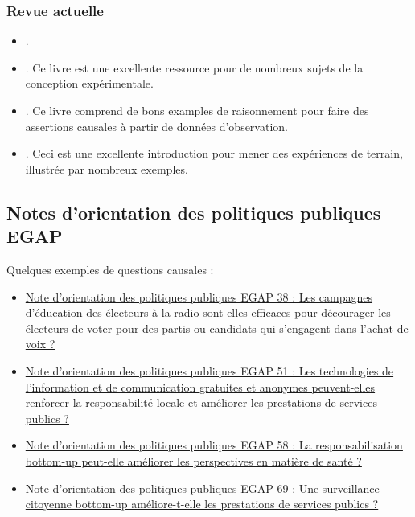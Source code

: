 \documentclass[12pt,]{book}
\begin{document}
\hypertarget{revue-actuelle}{%
\subsubsection{Revue actuelle}\label{revue-actuelle}}

\begin{itemize}
\item
  \autocite{brady2008causation}.
\item
  \autocite[Chapitre 1]{gerber_field_2012}. Ce livre est une excellente ressource pour de nombreux sujets de la conception expérimentale.
\item
  \autocite[Chapitre 1]{morgan_counterfactuals_2007}. Ce livre comprend de bons examples de raisonnement pour faire des assertions causales à partir de données d'observation.
\item
  \autocite{glennerster_running_2013}. Ceci est une excellente introduction pour mener des expériences de terrain, illustrée par nombreux exemples.
\end{itemize}

\hypertarget{notes-dorientation-des-politiques-publiques-egap}{%
\subsection{Notes d'orientation des politiques publiques EGAP}\label{notes-dorientation-des-politiques-publiques-egap}}

Quelques exemples de questions causales :

\begin{itemize}
\item
  \href{https://egap.org/resource/brief-38-diminishing-the-effectiveness-of-vote-buying-through-voter-education/}{Note d'orientation des politiques publiques EGAP 38 : Les campagnes d'éducation des électeurs à la radio sont-elles efficaces pour décourager les électeurs de voter pour des partis ou candidats qui s'engagent dans l'achat de voix ?}
\item
  \href{https://egap.org/resource/does-information-technology-improve-public-service-delivery-lessons-from-uganda/}{Note d'orientation des politiques publiques EGAP 51 : Les technologies de l'information et de communication gratuites et anonymes peuvent-elles renforcer la responsabilité locale et améliorer les prestations de services publics ?}
\item
  \href{https://egap.org/resource/does-bottom-up-accountability-work-evidence-from-uganda/}{Note d'orientation des politiques publiques EGAP 58 : La responsabilisation bottom-up peut-elle améliorer les perspectives en matière de santé ?}
\item
  \href{https://egap.org/resource/brief-69-bottom-up-accountability-and-public-service-provision-in-brazil/}{Note d'orientation des politiques publiques EGAP 69 : Une surveillance citoyenne bottom-up améliore-t-elle les prestations de services publics ?}
\end{itemize}
\end{document}
